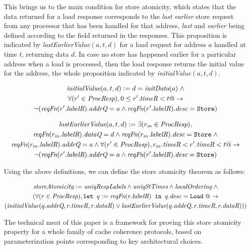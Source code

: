 This brings us to the main condition for store atomicity, which states that the
data returned for a load response corresponds to the \emph{last earlier} store
request from any processor that has been handled for that address,
\emph{last} and \emph{earlier} being defined according to the field \timeR{}
returned in the responses.  This proposition is indicated by
\textit{lastEarlierValue}$(a, t, d)$ for a load request for address $a$ handled
at time $t$, returning data $d$.  In case no store has happened earlier for a
particular address when a load is processed, then the load response returns the
initial value for the address, the whole proposition indicated by
\textit{initialValue}$(a, t, d)$.
\begin{defn}
\small
\begin{multline*}
\textit{initialValue}(a, t, d) := d = \textit{initData} (a) \; \wedge \\
\forall (r' \in \textit{ProcResp}), 0 \le r'.\textit{timeR} < t @->\\
\neg (\textit{reqFn} (r'.\textit{labelR}).\textit{addrQ} = a \wedge \textit{reqFn} (r'.\textit{labelR}).\textit{desc} = \texttt{Store})
\end{multline*}
\label{initialValue}
\end{defn}

\begin{defn}
\small
\begin{multline*}
\textit{lastEarlierValue}(a, t, d) := \exists (r_m \in \textit{ProcResp}),\\ \textit{reqFn} (r_m.\textit{labelR}).\textit{dataQ} = d \wedge 
\textit{reqFn} (r_m.\textit{labelR}).\textit{desc} = \texttt{Store} \; \wedge\\ \textit{reqFn} (r_m.\textit{labelR}).\textit{addrQ} = a \wedge
\forall (r' \in \textit{ProcResp}), r_m.\textit{timeR} < r'.\textit{timeR} < t @->\\
\neg (\textit{reqFn} (r'.\textit{labelR}).\textit{addrQ} = a \wedge \textit{reqFn} (r'.\textit{labelR}).\textit{desc} = \texttt{Store})
\end{multline*}
\label{lastEarlierValue}
\end{defn}

Using the above definitions, we can define the store atomicity theorem as follows:
\begin{thm}
\small
\begin{multline*}
\textit{storeAtomicity} := 
\textit{uniqRespLabels} \wedge
\textit{uniqStTimes} \wedge \textit{localOrdering} \; \wedge \\
(\forall (r \in \textit{ProcResp}), \texttt{let } q := \textit{reqFn}(r.\textit{labelR}) \texttt{ in } q.\textit{desc} = \texttt{Load} \; @-> \\
(\textit{initialValue}(q.\textit{addrQ}, r.\textit{timeR}, r.\textit{dataR}) \vee \textit{lastEarlierValue}(q.\textit{addrQ}, r.\textit{timeR}, r.\textit{dataR})))
\end{multline*}
\label{storeAtomicity}
\end{thm}

The technical meat of this paper is a framework for proving this store atomicity
property for a whole family of cache coherence protocols, based on parameterization
points corresponding to key architectural choices.

